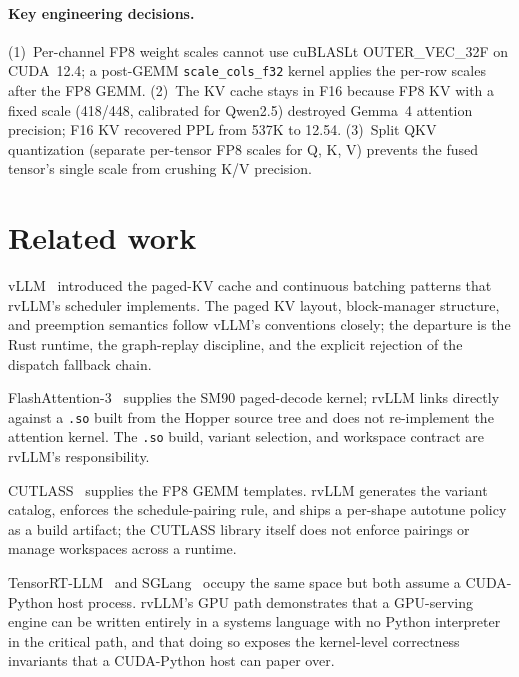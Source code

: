 \paragraph{Key engineering decisions.}
(1)~Per-channel FP8 weight scales cannot use cuBLASLt OUTER\_VEC\_32F
on CUDA~12.4; a post-GEMM \texttt{scale\_cols\_f32} kernel applies the
per-row scales after the FP8 GEMM.
(2)~The KV cache stays in F16 because FP8 KV with a fixed scale
(418/448, calibrated for Qwen2.5) destroyed Gemma~4 attention
precision; F16 KV recovered PPL from 537K to 12.54.
(3)~Split QKV quantization (separate per-tensor FP8 scales for Q, K, V)
prevents the fused tensor's single scale from crushing K/V precision.

\section{Related work}
\label{sec:related}

vLLM~\cite{kwon2023vllm} introduced the paged-KV cache and continuous
batching patterns that rvLLM's scheduler implements. The paged KV
layout, block-manager structure, and preemption semantics follow vLLM's
conventions closely; the departure is the Rust runtime, the graph-replay
discipline, and the explicit rejection of the dispatch fallback chain.

FlashAttention-3~\cite{shah2024flash3} supplies the SM90 paged-decode
kernel; rvLLM links directly against a \texttt{.so} built from the
Hopper source tree and does not re-implement the attention kernel. The
\texttt{.so} build, variant selection, and workspace contract are
rvLLM's responsibility.

CUTLASS~\cite{cutlass2024} supplies the FP8 GEMM templates. rvLLM
generates the variant catalog, enforces the schedule-pairing rule, and
ships a per-shape autotune policy as a build artifact; the CUTLASS
library itself does not enforce pairings or manage workspaces across a
runtime.

TensorRT-LLM~\cite{tensorrt_llm} and SGLang~\cite{sglang2024} occupy the
same space but both assume a CUDA-Python host process. rvLLM's GPU path
demonstrates that a GPU-serving engine can be written entirely in a
systems language with no Python interpreter in the critical path, and
that doing so exposes the kernel-level correctness invariants that a
CUDA-Python host can paper over.

